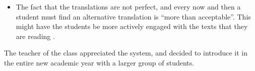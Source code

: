 \begin{itemize}
	\item The fact that the translations are not perfect, and every now and then a student must find an alternative translation is ``more than acceptable''. This might have the students be more actively engaged with the texts that they are reading . 


\end{itemize}


The teacher of the class appreciated the system, and decided to introduce it in the entire new academic year with a larger group of students. 
